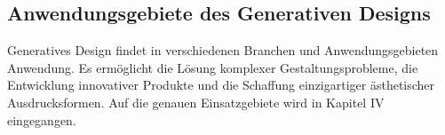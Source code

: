\subsection*{Anwendungsgebiete des Generativen Designs}
Generatives Design findet in verschiedenen Branchen und Anwendungsgebieten Anwendung. Es ermöglicht die Lösung komplexer Gestaltungsprobleme, die Entwicklung innovativer Produkte und die Schaffung einzigartiger ästhetischer Ausdrucksformen. Auf die genauen Einsatzgebiete wird in Kapitel IV eingegangen.
